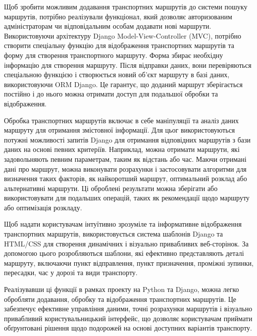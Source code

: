 Щоб зробити можливим додавання транспортних маршрутів до системи пошуку маршрутів, потрібно реалізували функціонал, який дозволяє авторизованим адміністраторам чи відповідальним особам додавати нові маршрути. Використовуючи архітектуру Django Model-View-Controller (MVC), потрібно створити спеціальну функцію для відображення транспортних маршрутів та форму для створення транспортного маршруту. Форма збирає необхідну інформацію для створення маршруту. Після відправки даних, вони перевіряються спеціальною функцією і створюється новий об'єкт маршруту в базі даних, використовуючи ORM Django. Це гарантує, що доданий маршрут зберігається постійно і до нього можна отримати доступ для подальшої обробки та відображення.

Обробка транспортних маршрутів включає в себе маніпуляції та аналіз даних маршруту для отримання змістовної інформації. Для цьог використовуються потужні можливості запитів Django для отримання відповідних маршрутів з бази даних на основі певних критеріїв. Наприклад, можна отримати маршрути, які задовольняють певним параметрам, таким як відстань або час. Маючи отримані дані про маршрут, можна виконувати розрахунки і застосовувати алгоритми для визначення таких факторів, як найкоротший маршрут, оптимальний розклад або альтернативні маршрути. Ці оброблені результати можна зберігати або використовувати для подальших операцій, таких як рекомендації щодо маршруту або оптимізація розкладу.

Щоб надати користувачам інтуїтивно зрозуміле та інформативне відображення транспортних маршрутів, використовується система шаблонів Django та HTML/CSS для створення динамічних і візуально привабливих веб-сторінок. За допомогою цього розробляються шаблони, які ефективно представляють деталі маршруту, включаючи пункт відправлення, пункт призначення, проміжні зупинки, пересадки, час у дорозі та види транспорту.

Реалізувавши ці функції в рамках проекту на Python та Django, можна легко обробляти додавання, обробку та відображення транспортних маршрутів. Це забезпечує ефективне управління даними, точні розрахунки маршрутів і візуально привабливий користувальницький інтерфейс, що дозволяє користувачам приймати обґрунтовані рішення щодо подорожей на основі доступних варіантів транспорту.